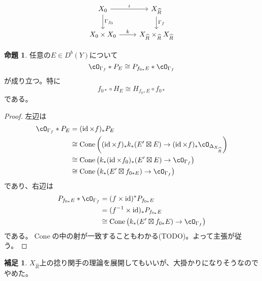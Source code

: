 \documentclass[uplatex, a4paper, dvipdfmx]{jsarticle}
\theoremstyle{definition}
\newtheorem{proposition}[theorem]{命題}
\newtheorem{remark}[theorem]{補足}
\DeclareMathOperator{\Cone}{\mathrm{Cone}}
\DeclareMathOperator{\id}{\mathrm{id}}
\begin{document}
\[
    \begin{tikzcd}
        X_0 \ar[r, "i"] \ar[d, "\Gamma_{f_0}"]& X_{\widehat{R}} \ar[d, "\Gamma_f"]\\
        X_0 \times X_0 \ar[r, "k"]& X_{\widehat{R}} \times_{\widehat{R}} X_{\widehat{R}}
    \end{tikzcd}
\]
\begin{proposition}
    任意の$E \in D^b(Y)$について
    \begin{equation}
        \cO_{\Gamma_f} * P_E \cong P_{f_{0*}E} * \cO_{\Gamma_f}
    \end{equation}
    が成り立つ。特に
    \begin{equation}
        f_{0*}\circ H_E \cong H_{f_{0*}E} \circ f_{0*}
    \end{equation}
    である。
\end{proposition}
\begin{proof}
    左辺は
    \begin{align}
        \cO_{\Gamma_f} * P_E & = (\id \times f)_* P_E                                                                                         \\
                             & \cong \Cone\left((\id \times f)_*k_*(E' \boxtimes E) \to (\id \times f)_*\cO_{\Delta_{X_{\widehat{R}}}}\right) \\
                             & \cong \Cone\left(k_*(\id \times f_0)_*(E' \boxtimes E) \to \cO_{\Gamma_f}\right)                               \\
                             & \cong \Cone\left(k_*(E' \boxtimes f_{0*E}) \to \cO_{\Gamma_f}\right)
    \end{align}
    であり、右辺は
    \begin{align}
        P_{f_{0*}E} * \cO_{\Gamma_f} & = (f \times \id)^*P_{f_{0*}E}                                        \\
                                     & = (f^{-1} \times \id)_*P_{f_{0*}E}                                   \\
                                     & \cong \Cone\left(k_*(E' \boxtimes f_{0*}E) \to \cO_{\Gamma_f}\right)
    \end{align}
    である。$\Cone$の中の射が一致することもわかる(TODO)。よって主張が従う。
\end{proof}
\begin{remark}
    $X_{\widehat{R}}$上の捻り関手の理論を展開してもいいが、大掛かりになりそうなのでやめた。
\end{remark}
\printbibliography[title=参考文献]
\end{document}
